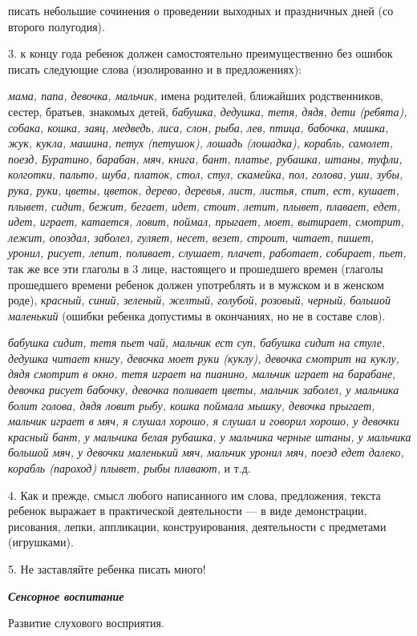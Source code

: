 \documentclass[a5paper]{book}
\renewcommand{\emph}[1]{\textit{#1}}
\begin{document}
писать небольшие сочинения о проведении выходных и праздничных дней (со
второго полугодия).

3. к концу года ребенок должен самостоятельно преимущественно без ошибок
писать следующие слова (изолированно и в предложениях):

\emph{мама, папа, девочка, мальчик,} имена родителей, ближайших
родственников, сестер, братьев, знакомых детей, \emph{бабушка, дедушка,
тетя, дядя, дети (ребята), собака, кошка, заяц, медведь, лиса, слон,
рыба, лев, птица, бабочка, мишка, жук, кукла, машина, петух (петушок),
лошадь (лошадка), корабль, самолет, поезд, Буратино, барабан, мяч,
книга, бант, платье, рубашка, штаны, туфли, колготки, пальто, шуба,
платок, стол, стул, скамейка, пол, голова, уши, зубы, рука, руки, цветы,
цветок, дерево, деревья, лист, листья, спит, ест, кушает, плывет, сидит,
бежит, бегает, идет, стоит, летит, плывет, плавает, едет, идет, играет,
катается, ловит, поймал, прыгает, моет, вытирает, смотрит, лежит,
опоздал, заболел, гуляет, несет, везет, строит, читает, пишет, уронил,
рисует, лепит, поливает, слушает, плачет, работает, собирает, пьет,} так
же все эти глаголы в 3 лице, настоящего и прошедшего времен (глаголы
прошедшего времени ребенок должен употреблять и в мужском и в женском
роде), \emph{красный, синий, зеленый, желтый, голубой, розовый, черный,
большой маленький} (ошибки ребенка допустимы в окончаниях, но не в
составе слов).

\emph{бабушка сидит, тетя пьет чай, мальчик ест суп, бабушка сидит на
стуле, дедушка читает книгу, девочка моет руки (куклу), девочка смотрит
на куклу, дядя смотрит в окно, тетя играет на пианино, мальчик играет на
барабане, девочка рисует бабочку, девочка поливает цветы, мальчик
заболел, у мальчика болит голова, дядя ловит рыбу, кошка поймала мышку,
девочка прыгает, мальчик играет в мяч, я слушал хорошо, я слушал и
говорил хорошо, у девочки красный бант, у мальчика белая рубашка, у
мальчика черные штаны, у мальчика большой мяч, у девочки маленький мяч,
мальчик уронил мяч, поезд едет далеко, корабль (пароход) плывет, рыбы
плавают,} и т.д.

4. Как и прежде, смысл любого написанного им слова, предложения, текста
ребенок выражает в практической деятельности --- в виде демонстрации,
рисования, лепки, аппликации, конструирования, деятельности с предметами
(игрушками).

5. Не заставляйте ребенка писать много!

\emph{\textbf{Сенсорное воспитание}}

Развитие слухового восприятия.
\end{document}
